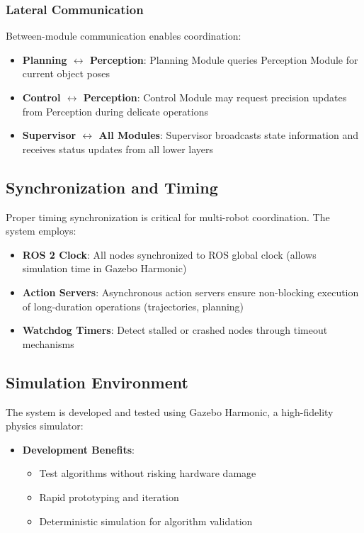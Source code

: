 \subsubsection{Lateral Communication}
Between-module communication enables coordination:
\begin{itemize}
    \item \textbf{Planning $\leftrightarrow$ Perception}: Planning Module queries Perception Module for current object poses
    \item \textbf{Control $\leftrightarrow$ Perception}: Control Module may request precision updates from Perception during delicate operations
    \item \textbf{Supervisor $\leftrightarrow$ All Modules}: Supervisor broadcasts state information and receives status updates from all lower layers
\end{itemize}

\subsection{Synchronization and Timing}
\label{subsec:synchronization_timing}

Proper timing synchronization is critical for multi-robot coordination. The system employs:

\begin{itemize}
    \item \textbf{ROS 2 Clock}: All nodes synchronized to ROS global clock (allows simulation time in Gazebo Harmonic)
    \item \textbf{Action Servers}: Asynchronous action servers ensure non-blocking execution of long-duration operations (trajectories, planning)
    \item \textbf{Watchdog Timers}: Detect stalled or crashed nodes through timeout mechanisms
\end{itemize}

\subsection{Simulation Environment}
\label{subsec:simulation_environment}

The system is developed and tested using Gazebo Harmonic, a high-fidelity physics simulator:

\begin{itemize}
    \item \textbf{Development Benefits}:
    \begin{itemize}
        \item Test algorithms without risking hardware damage
        \item Rapid prototyping and iteration
        \item Deterministic simulation for algorithm validation
    \end{itemize}
\end{itemize}

